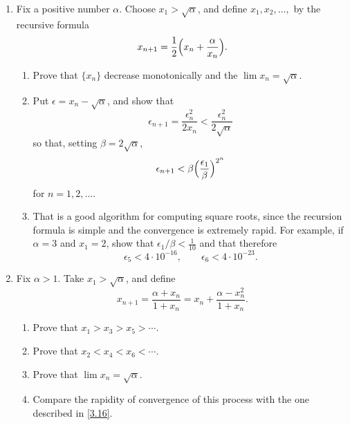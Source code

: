 \begin{enumerate}
\item
  \label{3.16}
  Fix a positive number \(\alpha\).
  Choose \(x_1 > \sqrt{\alpha}\), and define \(x_1,x_2,\ldots,\) by the
  recursive formula
  \[
  x_{n + 1} = \frac{1}{2}\Bigl(x_n + \frac{\alpha}{x_n}\Bigr).
  \]
  \begin{enumerate}[label = (\alph*)]
  \item
    Prove that \(\{x_n\}\) decrease monotonically and the
    \(\lim x_n = \sqrt{\alpha}\).
  \item
    Put \(\epsilon = x_n - \sqrt{\alpha}\), and show that
    \[
    \epsilon_{n + 1} = \frac{\epsilon_n^2}{2x_n} <
    \frac{\epsilon_n^2}{2\sqrt{\alpha}}
    \]
    so that, setting \(\beta = 2\sqrt{\alpha}\),
    \[
    \epsilon_{n + 1} < \beta\Bigl(\frac{\epsilon_1}{\beta}\Bigr)^{2^n}
    \]
    for \(n = 1,2,\ldots\).
  \item
    That is a good algorithm for computing square roots, since the recursion
    formula is simple and the convergence is extremely rapid.
    For example, if \(\alpha = 3\) and \(x_1 = 2\), show that
    \(\epsilon_1/\beta < \frac{1}{10}\) and that therefore
    \[
    \epsilon_5 < 4\cdot 10^{-16},\qquad\epsilon_6 < 4\cdot 10^{-23}.
    \]
  \end{enumerate}
\item
  Fix \(\alpha > 1\).
  Take \(x_1 > \sqrt{\alpha}\), and define
  \[
  x_{n + 1} = \frac{\alpha + x_n}{1 + x_n} = x_n +
  \frac{\alpha - x_n^2}{1 + x_n}.
  \]
  \begin{enumerate}[label = (\alph*)]
  \item
    Prove that \(x_1 > x_3 > x_5 > \cdots\).
  \item
    Prove that \(x_2 < x_4 < x_6 < \cdots\).
  \item
    Prove that \(\lim x_n = \sqrt{\alpha}\).
  \item
    Compare the rapidity of convergence of this process with the one described
    in \cref{3.16}.
  \end{enumerate}
\end{enumerate}
